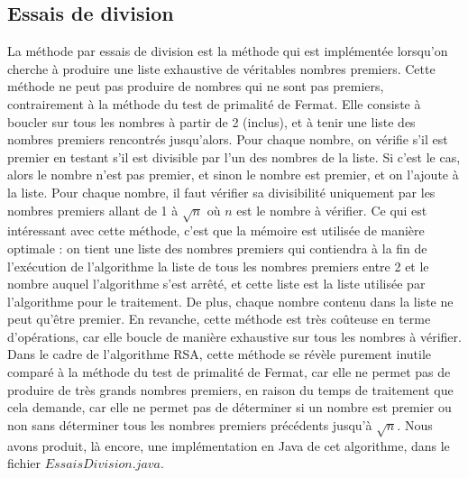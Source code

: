 		\subsection{Essais de division}
			La méthode par essais de division est la méthode qui est implémentée lorsqu'on cherche à produire une liste exhaustive de véritables nombres premiers. Cette méthode ne peut pas produire de nombres qui ne sont pas premiers, contrairement à la méthode du test de primalité de Fermat. Elle consiste à boucler sur tous les nombres à partir de 2 (inclus), et à tenir une liste des nombres premiers rencontrés jusqu'alors. Pour chaque nombre, on vérifie s'il est premier en testant s'il est divisible par l'un des nombres de la liste. Si c'est le cas, alors le nombre n'est pas premier, et sinon le nombre est premier, et on l'ajoute à la liste. Pour chaque nombre, il faut vérifier sa divisibilité uniquement par les nombres premiers allant de 1 à $\sqrt{n}$ où $n$ est le nombre à vérifier. Ce qui est intéressant avec cette méthode, c'est que la mémoire est utilisée de manière optimale : on tient une liste des nombres premiers qui contiendra à la fin de l'exécution de l'algorithme la liste de tous les nombres premiers entre 2 et le nombre auquel l'algorithme s'est arrêté, et cette liste est la liste utilisée par l'algorithme pour le traitement. De plus, chaque nombre contenu dans la liste ne peut qu'être premier. En revanche, cette méthode est très coûteuse en terme d'opérations, car elle boucle de manière exhaustive sur tous les nombres à vérifier. Dans le cadre de l'algorithme RSA, cette méthode se révèle purement inutile comparé à la méthode du test de primalité de Fermat, car elle ne permet pas de produire de très grands nombres premiers, en raison du temps de traitement que cela demande, car elle ne permet pas de déterminer si un nombre est premier ou non sans déterminer tous les nombres premiers précédents jusqu'à $\sqrt{n}$. Nous avons produit, là encore, une implémentation en Java de cet algorithme, dans le fichier $EssaisDivision.java$.

